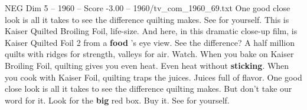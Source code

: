 \begin{textsample}{NEG Dim 5 – 1960 – Score -3.00 – 1960/tv\_com\_1960\_69.txt}  \label{ex:f5_neg_009}
One good close look is all it takes to see the difference quilting makes.
See for yourself.
This is Kaiser Quilted Broiling Foil, life-size.
And here, in this dramatic close-up film, is Kaiser Quilted Foil 2 from a \textbf{food} 's eye view.
See the difference?
A half million quilts with ridges for strength, valleys for air.
Watch.
When you bake on Kaiser Broiling Foil, quilting gives you even heat.
Even heat without \textbf{sticking}.
When you cook with Kaiser Foil, quilting traps the juices.
Juices full of flavor.
One good close look is all it takes to see the difference quilting makes.
But don't take our word for it.
Look for the \textbf{big} red box.
Buy it.
See for yourself.

\end{textsample}
